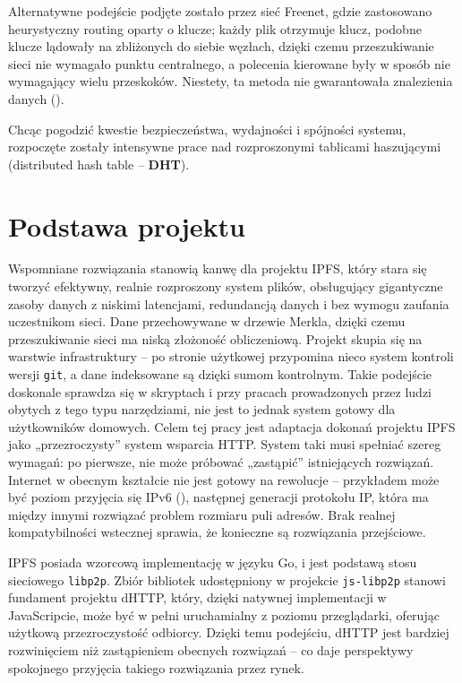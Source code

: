Alternatywne podejście podjęte zostało przez sieć Freenet, gdzie zastosowano heurystyczny routing oparty o klucze; każdy plik otrzymuje klucz, podobne klucze lądowały na zbliżonych do siebie węzłach, dzięki czemu przeszukiwanie sieci nie wymagało punktu centralnego, a polecenia kierowane były w sposób nie wymagający wielu przeskoków. Niestety, ta metoda nie gwarantowała znalezienia danych (\cite{searchingInSmallWorld}).

Chcąc pogodzić kwestie bezpieczeństwa, wydajności i spójności systemu, rozpoczęte zostały intensywne prace nad rozproszonymi tablicami haszującymi (distributed hash table -- \textbf{DHT}).

\section{Podstawa projektu}
\label{sec:podstawaProjektu}
Wspomniane rozwiązania stanowią kanwę dla projektu IPFS, który stara się tworzyć efektywny, realnie rozproszony system plików, obsługujący gigantyczne zasoby danych z niskimi latencjami, redundancją danych i bez wymogu zaufania uczestnikom sieci.  Dane przechowywane w drzewie Merkla, dzięki czemu przeszukiwanie sieci ma niską złożoność obliczeniową. Projekt skupia się na warstwie infrastruktury – po stronie użytkowej przypomina nieco system kontroli wersji \texttt{git}, a dane indeksowane są dzięki sumom kontrolnym. Takie podejście doskonale sprawdza się w skryptach i przy pracach prowadzonych przez ludzi obytych z tego typu narzędziami, nie jest to jednak system gotowy dla użytkowników domowych.
Celem tej pracy jest adaptacja dokonań projektu IPFS jako „przezroczysty” system wsparcia HTTP. System taki musi spełniać szereg wymagań: po pierwsze, nie może próbować „zastąpić” istniejących rozwiązań. Internet w obecnym kształcie nie jest gotowy na rewolucje – przykładem może być poziom przyjęcia się IPv6 (\cite{googleipv6}), następnej generacji protokołu IP, która ma między innymi rozwiązać problem rozmiaru puli adresów. Brak realnej kompatybilności wstecznej sprawia, że konieczne są rozwiązania przejściowe.

IPFS posiada wzorcową implementację w języku Go, i jest podstawą stosu sieciowego \texttt{libp2p}. Zbiór bibliotek udostępniony w projekcie \texttt{js-libp2p} stanowi fundament projektu dHTTP, który, dzięki natywnej implementacji w JavaScripcie, może być w pełni uruchamialny z poziomu przeglądarki, oferując użytkową przezroczystość odbiorcy. Dzięki temu podejściu, dHTTP jest bardziej rozwinięciem niż zastąpieniem obecnych rozwiązań -- co daje perspektywy spokojnego przyjęcia takiego rozwiązania przez rynek.

